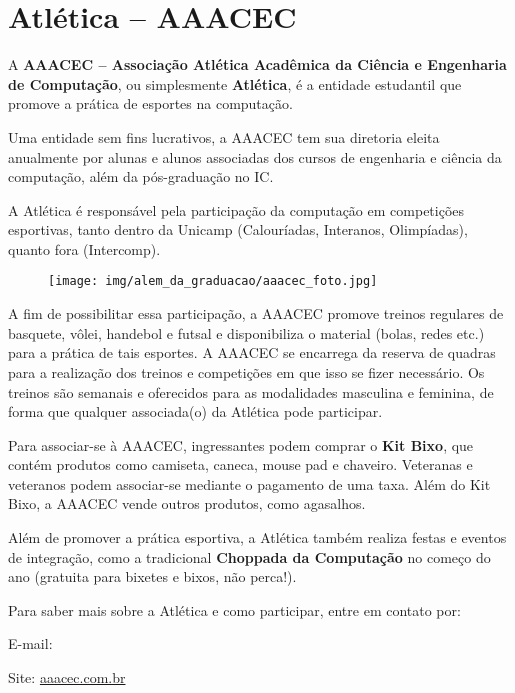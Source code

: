 
\section{Atlética -- AAACEC}

A \textbf{AAACEC -- Associação Atlética Acadêmica da Ciência e Engenharia de
Computação}, ou simplesmente \textbf{Atlética}, é a entidade estudantil que
promove a prática de esportes na computação.

Uma entidade sem fins lucrativos, a AAACEC tem sua diretoria eleita anualmente
por alunas e alunos associadas dos cursos de engenharia e ciência da
computação, além da pós-graduação no IC.

A Atlética é responsável pela participação da computação em competições
esportivas, tanto dentro da Unicamp (Calouríadas, Interanos, Olimpíadas),
quanto fora (Intercomp).

\begin{figure}[H]
  \centering
  \texttt{[image: img/alem\_da\_graduacao/aaacec\_foto.jpg]}
\end{figure}

A fim de possibilitar essa participação, a AAACEC promove treinos regulares de
basquete, vôlei, handebol e futsal e disponibiliza o material (bolas, redes
etc.) para a prática de tais esportes. A AAACEC se encarrega da reserva de
quadras para a realização dos treinos e competições em que isso se fizer
necessário. Os treinos são semanais e oferecidos para as modalidades masculina
e feminina, de forma que qualquer associada(o) da Atlética pode participar.

Para associar-se à AAACEC, ingressantes podem comprar o \textbf{Kit Bixo},
que contém produtos co\-mo camiseta, caneca, mouse pad e chaveiro. Veteranas
e veteranos podem associar-se mediante o pagamento de uma taxa. Além do Kit
Bixo, a AAACEC vende outros produtos, como agasalhos.

Além de promover a prática esportiva, a Atlética também realiza festas e
eventos de integração, como a tradicional \textbf{Choppada da Computação} no
começo do ano (gratuita para bixetes e bixos, não perca!).

Para saber mais sobre a Atlética e como participar, entre em contato por:
\begin{compactitemize}
\item E-mail: 
\item Site: \url{aaacec.com.br}
\end{compactitemize}
